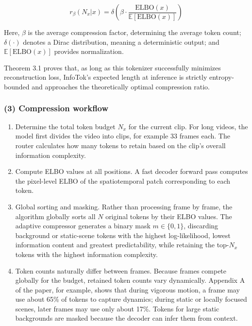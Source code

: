 \[
r_\beta(N_x|x) =
\delta\left(
\beta\cdot
\frac{\mathrm{ELBO}(x)}
{\mathbb{E}[\mathrm{ELBO}(x)]}
\right)
\]

Here, \(\beta\) is the average compression factor, determining the average token count; \(\delta(\cdot)\) denotes a Dirac distribution, meaning a deterministic output; and \(\mathbb{E}[\mathrm{ELBO}(x)]\) provides normalization.

Theorem 3.1 proves that, as long as this tokenizer successfully minimizes reconstruction loss, InfoTok's expected length at inference is strictly entropy-bounded and approaches the theoretically optimal compression ratio.

\hypertarget{compression-workflow}{%
\subsubsection{(3) Compression workflow}\label{compression-workflow}}

\begin{enumerate}
\def\labelenumi{\arabic{enumi}.}
\tightlist
\item
  Determine the total token budget \(N_x\) for the current clip. For long videos, the model first divides the video into clips, for example 33 frames each. The router calculates how many tokens to retain based on the clip's overall information complexity.
\item
  Compute ELBO values at all positions. A fast decoder forward pass computes the pixel-level ELBO of the spatiotemporal patch corresponding to each token.
\item
  Global sorting and masking. Rather than processing frame by frame, the algorithm globally sorts all \(N\) original tokens by their ELBO values. The adaptive compressor generates a binary mask \(m\in\{0,1\}\), discarding background or static-scene tokens with the highest log-likelihood, lowest information content and greatest predictability, while retaining the top-\(N_x\) tokens with the highest information complexity.
\item
  Token counts naturally differ between frames. Because frames compete globally for the budget, retained token counts vary dynamically. Appendix A of the paper, for example, shows that during vigorous motion, a frame may use about 65\% of tokens to capture dynamics; during static or locally focused scenes, later frames may use only about 17\%. Tokens for large static backgrounds are masked because the decoder can infer them from context.
\end{enumerate}

